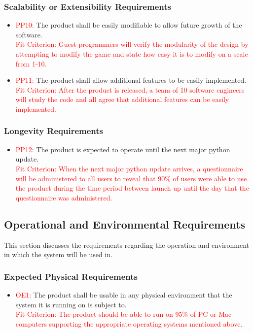 \documentclass[12pt, titlepage]{article}
\begin{document}
\subsubsection{Scalability or Extensibility Requirements}
\begin{itemize}
\item \textcolor{red}{PP10: }The product shall be easily modifiable to allow future growth of the software.\\
\textcolor{red}{Fit Criterion: Guest programmers will verify the modularity of the design by attempting to modify the game and state how easy it is to modify on a scale from 1-10.}
\item \textcolor{red}{PP11: }The product shall allow additional features to be easily implemented.\\
\textcolor{red}{Fit Criterion: After the product is released, a team of 10 software engineers will study the code and all agree that additional features can be easily implemented.}
\end{itemize}

\subsubsection{Longevity Requirements}
\begin{itemize}
\item \textcolor{red}{PP12: }The product is expected to operate until the next major python update.\\
\textcolor{red}{Fit Criterion: When the next major python update arrives, a questionnaire will be administered to all users to reveal that 90\% of users were able to use the product during the time period between launch up until the day that the questionnaire was administered.}
\end{itemize}

\subsection{Operational and Environmental Requirements}
This section discusses the requirements regarding the operation and environment in which the system will be used in.

\subsubsection{Expected Physical Requirements}
\begin{itemize}
\item \textcolor{red}{OE1: }The product shall be usable in any physical environment that the system it is running on is subject to.\\
\textcolor{red}{Fit Criterion: The product should be able to run on 95\% of PC or Mac computers supporting the appropriate operating systems mentioned above.}
\end{itemize}
\end{document}
